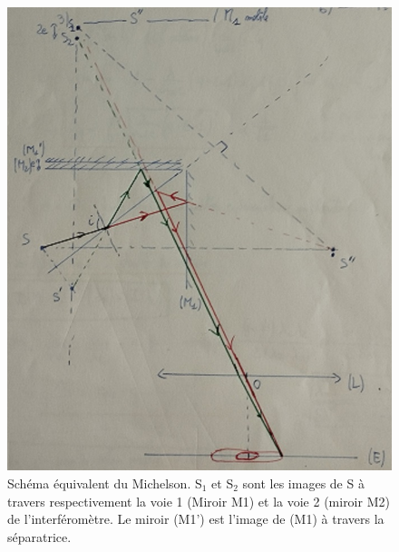   \begin{figure}[!htbp]
  \centering
  \includegraphics[scale=0.4]{LP_DivisionAmplitude/Michelson.jpg}
  \caption{\label{fig:Michelson}Schéma équivalent du Michelson. S$_1$ et S$_2$ sont les images de S à travers respectivement la voie 1 (Miroir M1) et la voie 2 (miroir M2) de l'interféromètre. Le miroir (M1') est l'image de (M1) à travers la séparatrice.}
  \end{figure}
  \clearpage
  
  

